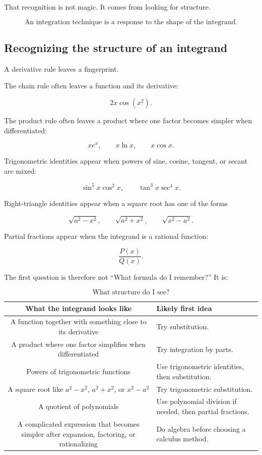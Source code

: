 That recognition is not magic.  It comes from looking for structure.

\[
\boxed{
\text{An integration technique is a response to the shape of the integrand.}
}
\]

\subsection{Recognizing the structure of an integrand}
\label{subsec:recognizing-integrand-structure}

A derivative rule leaves a fingerprint.

The chain rule often leaves a function and its derivative:

\[
2x\cos(x^2).
\]

The product rule often leaves a product where one factor becomes simpler when
differentiated:

\[
x e^x,
\qquad
x\ln x,
\qquad
x\cos x.
\]

Trigonometric identities appear when powers of sine, cosine, tangent, or secant are
mixed:

\[
\sin^5x\cos^2x,
\qquad
\tan^3x\sec^4x.
\]

Right-triangle identities appear when a square root has one of the forms

\[
\sqrt{a^2-x^2},
\qquad
\sqrt{a^2+x^2},
\qquad
\sqrt{x^2-a^2}.
\]

Partial fractions appear when the integrand is a rational function:

\[
\frac{P(x)}{Q(x)}.
\]

The first question is therefore not ``What formula do I remember?''  It is:

\[
\boxed{
\text{What structure do I see?}
}
\]

\begin{center}
\begin{tabular}{c|p{}}
\textbf{What the integrand looks like} & \textbf{Likely first idea} \\ \hline
A function together with something close to its derivative & Try substitution. \\[5pt]
A product where one factor simplifies when differentiated & Try integration by parts. \\[5pt]
Powers of trigonometric functions & Use trigonometric identities, then substitution. \\[5pt]
A square root like \(a^2-x^2\), \(a^2+x^2\), or \(x^2-a^2\) & Try trigonometric substitution. \\[5pt]
A quotient of polynomials & Use polynomial division if needed, then partial fractions. \\[5pt]
A complicated expression that becomes simpler after expansion, factoring, or rationalizing & Do algebra before choosing a calculus method.
\end{tabular}
\end{center}

